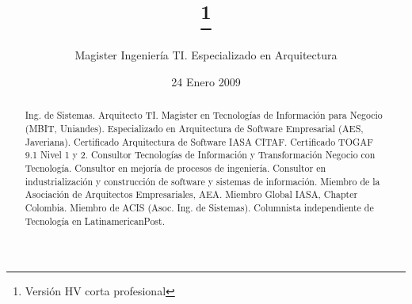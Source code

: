 \documentclass{tufte-handout}
\title{\thanks{Versión HV corta profesional}}
\author[Magister Ingeniería TI. Especializado en Arquitectura]{Magister
Ingeniería TI. Especializado en Arquitectura}
\date{24 Enero 2009}  %
\begin{document}
\maketitle %



\begin{abstract}
    
\noindent Ing. de Sistemas. Arquitecto TI. Magister en Tecnologías de
Información para Negocio (MBIT, Uniandes). Especializado en Arquitectura
de Software Empresarial (AES, Javeriana). Certificado Arquitectura de
Software IASA CITAF. Certificado TOGAF 9.1 Nivel 1 y 2. Consultor
Tecnologías de Información y Transformación Negocio con Tecnología.
Consultor en mejoría de procesos de ingeniería. Consultor en
industrialización y construcción de software y sistemas de información.
Miembro de la Asociación de Arquitectos Empresariales, AEA. Miembro
Global IASA, Chapter Colombia. Miembro de ACIS (Asoc. Ing. de Sistemas).
Columnista independiente de Tecnología en LatinamericanPost.
\end{abstract}
  
\end{document}
